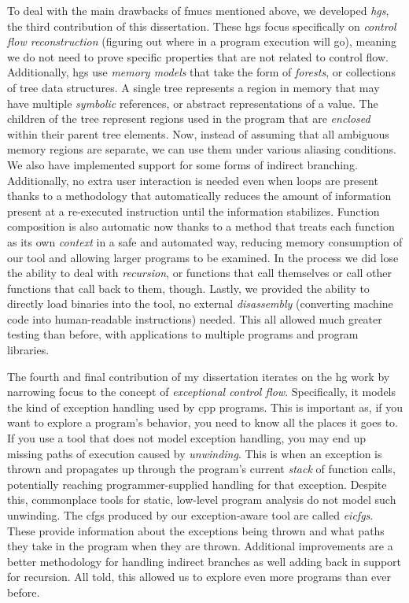 {  To deal with the main drawbacks of \acp{fmuc} mentioned above, we developed \emph{\acfp{hg}}, the third contribution of this dissertation.
  These \acp{hg} focus specifically on \emph{control flow reconstruction} (figuring out where in a program execution will go), meaning we do not need to prove specific properties that are not related to control flow.
  Additionally, \acp{hg} use \emph{memory models} that take the form of \emph{forests}, or collections of tree data structures.
  A single tree represents a region in memory that may have multiple \emph{symbolic} references, or abstract representations of a value.
  The children of the tree represent regions used in the program that are \emph{enclosed} within their parent tree elements.
  Now, instead of assuming that all ambiguous memory regions are separate, we can use them under various aliasing conditions.
  We also have implemented support for some forms of indirect branching.
  Additionally, no extra user interaction is needed even when loops are present thanks to a methodology that automatically reduces the amount of information present at a re-executed instruction until the information stabilizes.
  Function composition is also automatic now thanks to a method that treats each function as its own \emph{context} in a safe and automated way, reducing memory consumption of our tool and allowing larger programs to be examined.
  In the process we did lose the ability to deal with \emph{recursion}, or functions that call themselves or call other functions that call back to them, though.
  Lastly, we provided the ability to directly load binaries into the tool, no external \emph{disassembly} (converting machine code into human-readable instructions) needed.
  This all allowed much greater testing than before, with applications to multiple programs and program libraries.

  The fourth and final contribution of my dissertation iterates on the \ac{hg} work by narrowing focus to the concept of \emph{exceptional control flow}.
  Specifically, it models the kind of exception handling used by \gls{cpp} programs.
  This is important as, if you want to explore a program's behavior, you need to know all the places it goes to.
  If you use a tool that does not model exception handling, you may end up missing paths of execution caused by \emph{unwinding}.
  This is when an exception is thrown and propagates up through the program's current \emph{stack} of function calls, potentially reaching programmer-supplied handling for that exception.
  Despite this, commonplace tools for static, low-level program analysis do not model such unwinding.
  The \acp{cfg} produced by our exception-aware tool are called \emph{\acfp{eicfg}}.
  These provide information about the exceptions being thrown and what paths they take in the program when they are thrown.
  Additional improvements are a better methodology for handling indirect branches as well adding back in support for recursion.
  All told, this allowed us to explore even more programs than ever before.
}
